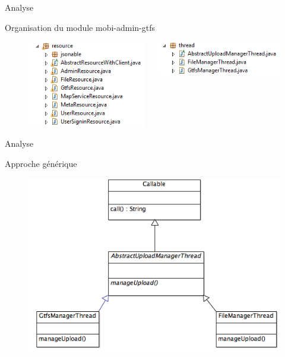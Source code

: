 \documentclass[utf8,compress]{beamer}
\begin{document}
\begin{frame}{Analyse}
\begin{block}{Organisation du module \og mobi-admin-gtfs \fg}

\begin{figure}[h]
\begin{columns}[c]
       \begin{flushleft}
	   \includegraphics[scale=0.5]{images/Package_explorer_MobiSAAS_Resource.PNG}
		\end{flushleft}
    \column{.005\texwidth}
       \begin{flushleft}    
    	\includegraphics[scale=0.5]{images/Package_explorer_MobiSAAS_Thread.PNG}
       \end{flushleft}
\end{columns}
\end{figure}
\end{block}
\end{frame}
\begin{frame}{Analyse}
\begin{block}{Approche générique}
\begin{figure}[h]
    \center
    \includegraphics[scale=0.5]{images/DiagrammeThread.png}
\end{figure}
\end{block}
\end{frame}
\end{document}
